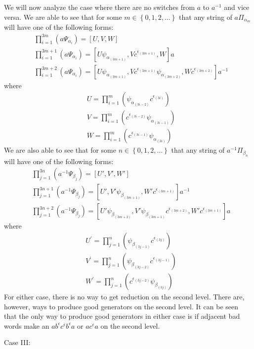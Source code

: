 \documentclass[11pt]{amsart}
\theoremstyle{definition}
\theoremstyle{remark}
\numberwithin{equation}{section}
\begin{document}
We will now analyze the case where there are no switches from $a$ to $a^{-1}$ and vice versa.  We are able to see that for some $m\in\left\{0,1,2,\ldots\right\}$ that any string of $a\Pi_{\alpha_m}$ will have one of the following forms:
\begin{align*}
& \prod^{3m}_{i=1}(a\Psi_{\alpha_i})=[U,V,W]\\
& \prod^{3m+1}_{i=1}(a\Psi_{\alpha_i})=\left[U\psi_{\alpha_{(3m+1)}},Vc^{\epsilon_{(3m+1)}},W\right]a\\
& \prod^{3m+2}_{i=1}(a\Psi_{\alpha_i})=\left[U\psi_{\alpha_{(3m+1)}},Vc^{\epsilon_{(3m+1)}}\psi_{\alpha_{(3m+2)}},Wc^{\epsilon_{(3m+2)}}\right]a^{-1}
\end{align*}
where
\begin{align*}
& U=\prod^{m}_{i=1}(\psi_{\alpha_{(3i-2)}}c^{\epsilon_{(3i)}})\\
& V=\prod^{m}_{i=1}(c^{\epsilon_{(3i-2)}}\psi_{\alpha_{(3i-1)}})\\ 
& W=\prod^{m}_{i=1}(c^{\epsilon_{(3i-1)}}\psi_{\alpha_{(3i)}}) 
\end{align*}
We are also able to see that for some $n\in\left\{0,1,2,\ldots\right\}$ that any string of $a^{-1}\Pi_{\beta_n}$ will have one of the following forms:
\begin{align*}
& \prod^{3n}_{j=1}(a^{-1}\Psi_{\beta_j})=\left[U',V',W'\right]\\
& \prod^{3n+1}_{j=1}(a^{-1}\Psi_{\beta_j})=\left[U',V'\psi_{\beta_{(3m+1)}},W'c^{\epsilon_{(3m+1)}}\right]a^{-1}\\
& \prod^{3n+2}_{j=1}(a^{-1}\Psi_{\beta_j})=\left[U'\psi_{\beta_{(3m+2)}},V'\psi_{\beta_{(3m+1)}}c^{\epsilon_{(3m+2)}},W'c^{\epsilon_{(3m+1)}}\right]a
\end{align*}
where
\begin{align*}
& U^{'}=\prod^{n}_{j=1}(\psi_{\beta_{(3j-1)}}c^{\epsilon_{(3j)}})\\
& V^{'}=\prod^{n}_{j=1}(\psi_{\beta_{(3j-2)}}c^{\epsilon_{(3j-1)}})\\ 
& W^{'}=\prod^{n}_{j=1}(c^{\epsilon_{(3j-2)}}\psi_{\beta_{(3j)}}) 
\end{align*}
For either case, there is no way to get reduction on the second level.  There are, however, ways to produce good generators on the second level.  It can be seen that the only way to produce good generators in either case is if adjacent bad words make an $ab^{\epsilon}c^{\epsilon}b^{\epsilon}a$ or $ac^{\epsilon}a$ on the second level.

Case III:
 
\end{document}
